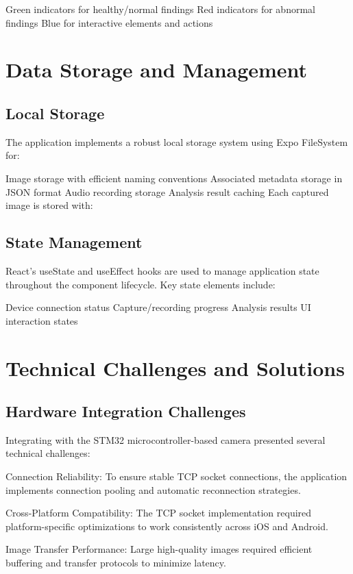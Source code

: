 Green indicators for healthy/normal findings
Red indicators for abnormal findings
Blue for interactive elements and actions
\section{Data Storage and Management}

\subsection{Local Storage}

The application implements a robust local storage system using Expo FileSystem for:

Image storage with efficient naming conventions
Associated metadata storage in JSON format
Audio recording storage
Analysis result caching
Each captured image is stored with:

\subsection{State Management}

React's useState and useEffect hooks are used to manage application state throughout the component lifecycle. Key state elements include:

Device connection status
Capture/recording progress
Analysis results
UI interaction states
\section{Technical Challenges and Solutions}

\subsection{Hardware Integration Challenges}

Integrating with the STM32 microcontroller-based camera presented several technical challenges:

Connection Reliability: To ensure stable TCP socket connections, the application implements connection pooling and automatic reconnection strategies.

Cross-Platform Compatibility: The TCP socket implementation required platform-specific optimizations to work consistently across iOS and Android.

Image Transfer Performance: Large high-quality images required efficient buffering and transfer protocols to minimize latency.


